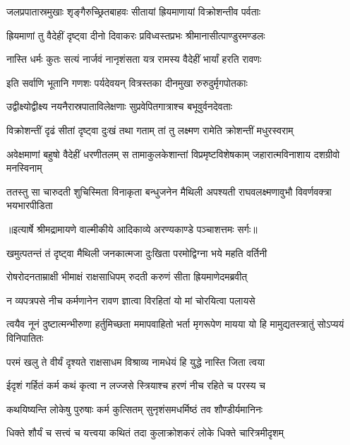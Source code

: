 \twolineshloka
{जलप्रपातास्रमुखाः शृङ्गैरुच्छ्रितबाहवः}
{सीतायां ह्रियमाणायां विक्रोशन्तीव पर्वताः} %

\twolineshloka
{ह्रियमाणां तु वैदेहीं दृष्ट्वा दीनो दिवाकरः}
{प्रविध्वस्तप्रभः श्रीमानासीत्पाण्डुरमण्डलः} %

\twolineshloka
{नास्ति धर्मः कुतः सत्यं नार्जवं नानृशंसता}
{यत्र रामस्य वैदेहीं भार्यां हरति रावणः} %

\twolineshloka
{इति सर्वाणि भूतानि गणशः पर्यदेवयन्}
{वित्रस्तका दीनमुखा रुरुदुर्मृगपोतकाः} %

\twolineshloka
{उद्वीक्ष्योद्वीक्ष्य नयनैरास्रपाताविलेक्षणाः}
{सुप्रवेपितगात्राश्च बभूवुर्वनदेवताः} %

\twolineshloka
{विक्रोशन्तीं दृढं सीतां दृष्ट्वा दुःखं तथा गताम्}
{तां तु लक्ष्मण रामेति क्रोशन्तीं मधुरस्वराम्} %

\threelineshloka
{अवेक्षमाणां बहुषो वैदेहीं धरणीतलम्}
{स तामाकुलकेशान्तां विप्रमृष्टविशेषकाम्}
{जहारात्मविनाशाय दशग्रीवो मनस्विनाम्} %

\fourlineindentedshloka
{ततस्तु सा चारुदती शुचिस्मिता}
{ विनाकृता बन्धुजनेन मैथिली}
{अपश्यती राघवलक्ष्मणावुभौ}
{ विवर्णवक्त्रा भयभारपीडिता} %


{॥इत्यार्षे श्रीमद्रामायणे वाल्मीकीये आदिकाव्ये अरण्यकाण्डे पञ्चाशत्तमः सर्गः॥}


\twolineshloka
{खमुत्पतन्तं तं दृष्ट्वा मैथिली जनकात्मजा}
{दुःखिता परमोद्विग्ना भये महति वर्तिनी} %

\twolineshloka
{रोषरोदनताम्राक्षी भीमाक्षं राक्षसाधिपम्}
{रुदती करुणं सीता ह्रियमाणेदमब्रवीत्} %

\twolineshloka
{न व्यपत्रपसे नीच कर्मणानेन रावण}
{ज्ञात्वा विरहितां यो मां चोरयित्वा पलायसे} %

\threelineshloka
{त्वयैव नूनं दुष्टात्मन्भीरुणा हर्तुमिच्छता}
{ममापवाहितो भर्ता मृगरूपेण मायया}
{यो हि मामुद्यतस्त्रातुं सोऽप्ययं विनिपातितः} %

\twolineshloka
{परमं खलु ते वीर्यं दृश्यते राक्षसाधम}
{विश्राव्य नामधेयं हि युद्धे नास्ति जिता त्वया} %

\twolineshloka
{ईदृशं गर्हितं कर्म कथं कृत्वा न लज्जसे}
{स्त्रियाश्च हरणं नीच रहिते च परस्य च} %

\twolineshloka
{कथयिष्यन्ति लोकेषु पुरुषाः कर्म कुत्सितम्}
{सुनृशंसमधर्मिष्ठं तव शौण्डीर्यमानिनः} %

\twolineshloka
{धिक्ते शौर्यं च सत्त्वं च यत्त्वया कथितं तदा}
{कुलाक्रोशकरं लोके धिक्ते चारित्रमीदृशम्} %

